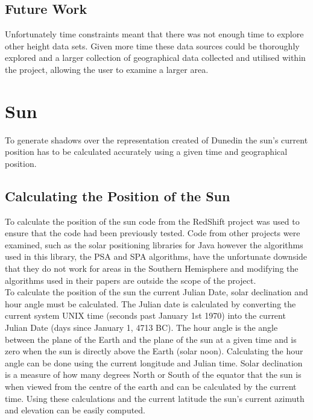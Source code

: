 \documentclass[12pt]{report}
\begin{document}
\subsection{Future Work}
Unfortunately time constraints meant that there was not enough time to explore other height data sets.
 Given more time these data sources could be thoroughly explored and a larger collection of geographical data collected and utilised within the project, allowing the user to examine a larger area.

\section{Sun}
To generate shadows over the representation created of Dunedin the sun's current position has to be calculated accurately using a given time and geographical position.\\

\subsection{Calculating the Position of the Sun}
To calculate the position of the sun code from the RedShift project\cite{redshift} was used to ensure that the code had been previously tested. Code from other projects were examined, such as the solar positioning libraries for Java\cite{javasunlib} however the algorithms used in this library, the PSA\cite{psa} and SPA\cite{spa} algorithms, have the unfortunate downside that they do not work for areas in the Southern Hemisphere and modifying the algorithms used in their papers are outside the scope of the project.\\

To calculate the position of the sun the current Julian Date, solar declination and hour angle must be calculated. The Julian date is calculated by converting the current system UNIX time (seconds past January 1st 1970) into the current Julian Date (days since January 1, 4713 BC).
The hour angle is the angle between the plane of the Earth and the plane of the sun at a given time and is zero when the sun is directly above the Earth (solar noon). Calculating the hour angle can be done using the current longitude and Julian time. Solar declination is a measure of how many degrees North or South of the equator that the sun is when viewed from the centre of the earth and can be calculated by the current time. Using these calculations and the current latitude the sun's current azimuth and elevation can be easily computed.\\
\end{document}
